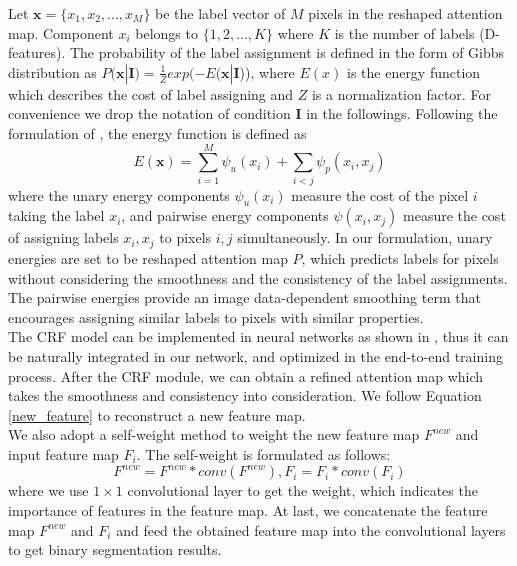 \documentclass[runningheads]{llncs}
\begin{document}
\indent Let $\textbf{x} = \{x_1, x_2, ..., x_M\}$ be the label vector of $M$ pixels in the reshaped attention map. Component $x_i$ belongs to $\{1, 2, ..., K\}$ where $K$ is the number of labels (D-features). The probability of the label assignment is defined in the form of Gibbs distribution as $P(\textbf{x}|\textbf{I}) = \frac{1}{Z}exp(-E(\textbf{x}|\textbf{I}$)), where $E(x)$ is the energy function which describes the cost of label assigning and $Z$ is a normalization factor. For convenience we drop the notation of condition $\textbf{I}$ in the followings. Following the formulation of  \cite{densecrf}, the energy function is defined as 
\begin{equation}
E(\textbf{x}) = \sum_{i=1}^{M}\psi_{u}(x_i) + \sum_{i < j}\psi_{p}(x_i, x_j)
\end{equation}
where the unary energy components $\psi_{u}(x_i)$ measure the cost of the pixel $i$ taking the label $x_i$, and pairwise energy components $\psi(x_i, x_j)$  measure the cost of assigning labels $x_i, x_j$ to pixels $i, j$ simultaneously. In our formulation, unary energies are set to be reshaped attention map $P$, which predicts labels for pixels without considering the smoothness and the consistency of the label assignments. The pairwise energies provide an image data-dependent smoothing term that encourages assigning similar labels to pixels with similar properties. \\
\indent The CRF model can be implemented in neural networks as shown in \cite{CRFasRNN,crf_conv}, thus it can be naturally   integrated in our network, and optimized in the end-to-end training process. After the CRF module, we can obtain a refined attention map which takes the smoothness and consistency  into consideration. We follow Equation \ref{new_feature} to reconstruct a new feature map. \\
\indent We also adopt a self-weight method to weight the new feature map $F^{new}$ and input feature map $F_i$. The self-weight is formulated as follows:
\begin{equation}
F^{new} = F^{new}* conv(F^{new}), F_i = F_i* conv(F_i)
\end{equation}
where we use $1 \times 1$ convolutional layer to get the weight, which indicates the importance of features in the feature map. At last, we concatenate the feature map $F^{new}$ and $F_i$ and feed the obtained feature map into the convolutional layers to get binary  segmentation results.
\end{document}
